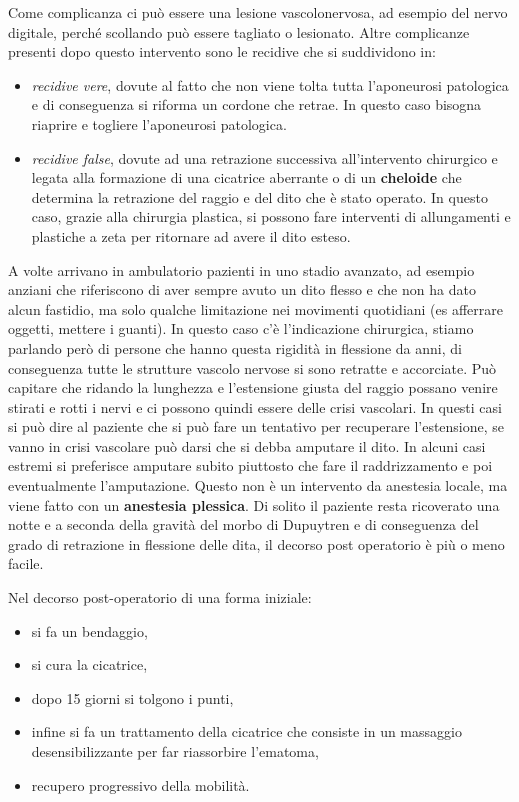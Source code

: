 Come complicanza ci può essere una lesione vascolonervosa, ad esempio del nervo digitale, perché scollando può essere tagliato o lesionato.
Altre complicanze presenti dopo questo intervento sono le recidive che si suddividono in:

\begin{itemize}
\item
  \emph{recidive vere}, dovute al fatto che non viene tolta tutta l'aponeurosi patologica e di conseguenza si riforma un cordone che retrae. In questo caso bisogna riaprire e togliere l'aponeurosi patologica.
\item
  \emph{recidive false}, dovute ad una retrazione successiva all'intervento chirurgico e legata alla formazione di una cicatrice aberrante o di un \textbf{cheloide} che determina la retrazione del raggio e del dito che è stato operato. In questo caso, grazie alla chirurgia plastica, si possono fare interventi di allungamenti e plastiche a zeta per ritornare ad avere il dito esteso.
\end{itemize}

A volte arrivano in ambulatorio pazienti in uno stadio avanzato, ad esempio anziani che riferiscono di aver sempre avuto un dito flesso e che non ha dato alcun fastidio, ma solo qualche limitazione nei
movimenti quotidiani (es afferrare oggetti, mettere i guanti). In questo caso c'è l'indicazione chirurgica, stiamo parlando però di persone che
hanno questa rigidità in flessione da anni, di conseguenza tutte le strutture vascolo nervose si sono retratte e accorciate. Può capitare che ridando la lunghezza e l'estensione giusta del raggio possano venire stirati e rotti i nervi e ci possono quindi essere delle crisi vascolari. In questi casi si può dire al paziente che si può fare un
tentativo per recuperare l'estensione, se vanno in crisi vascolare può darsi che si debba amputare il dito. In alcuni casi estremi si preferisce amputare subito piuttosto che fare il raddrizzamento e poi
eventualmente l'amputazione. Questo non è un intervento da anestesia locale, ma viene fatto con un \textbf{anestesia plessica}. Di solito il
paziente resta ricoverato una notte e a seconda della gravità del morbo di Dupuytren e di conseguenza del grado di retrazione in flessione delle dita, il decorso post operatorio è più o meno facile.

Nel decorso post-operatorio di una forma iniziale:

\begin{itemize}
\item
  si fa un bendaggio,
\item
  si cura la cicatrice,
\item
  dopo 15 giorni si tolgono i punti,
\item
  infine si fa un trattamento della cicatrice che consiste in un massaggio desensibilizzante per far riassorbire l'ematoma,
\item
  recupero progressivo della mobilità.
\end{itemize}


